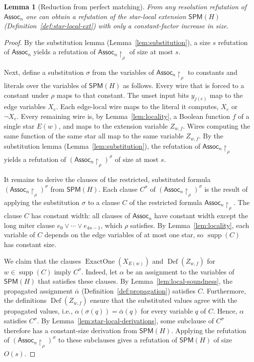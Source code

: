 \documentclass[11pt]{article}
\newtheorem{lemma}[theorem]{Lemma}
\theoremstyle{definition}
\theoremstyle{remark}
\newcommand{\Assoc}{\mathsf{Assoc}}
\newcommand{\SPM}{\mathsf{SPM}}
\newcommand{\supp}{\operatorname{supp}}
\begin{document}
\begin{lemma}[Reduction from perfect matching]
\label{lem:reduction}
From any resolution refutation of $\Assoc_n$ one can obtain a refutation of
the star-local extension $\SPM(H)$ (Definition~\ref{def:star-local-ext}) with only a constant-factor increase in size.
\end{lemma}

\begin{proof}
By the substitution lemma (Lemma~\ref{lem:substitution}), a size $s$ refutation of $\Assoc_n$ yields a refutation of
$\Assoc_n\!\upharpoonright_\rho$ of size at most $s$.

Next, define a substitution $\sigma$ from the variables of $\Assoc_n\!\upharpoonright_\rho$ to constants and literals over the variables of
$\SPM(H)$ as follows. Every wire that is forced to a constant under $\rho$ maps to that constant. The unset input bits
$y_{j(e)}$ map to the edge variables $X_e$. Each edge-local wire maps to the literal it computes, $X_e$ or $\neg X_e$. Every remaining wire is, by Lemma~\ref{lem:locality}, a Boolean function $f$ of a single
star $E(w)$, and maps to the extension variable $Z_{w,f}$. Wires computing the same function of the same star all map to the same variable $Z_{w,f}$. By the substitution lemma (Lemma~\ref{lem:substitution}), the refutation of $\Assoc_n\!\upharpoonright_\rho$ yields a refutation of
$(\Assoc_n\!\upharpoonright_\rho)^\sigma$ of size at most $s$.

It remains to derive the clauses of the restricted, substituted formula $(\Assoc_n\!\upharpoonright_\rho)^\sigma$ from $\SPM(H)$. Each clause $C^\sigma$ of $(\Assoc_n\!\upharpoonright_\rho)^\sigma$ is the result of applying the substitution $\sigma$ to a clause $C$ of the restricted formula $\Assoc_n\!\upharpoonright_\rho$. The clause $C$ has constant width: all clauses of $\Assoc_n$ have constant width except the long miter clause $e_0\vee\cdots\vee e_{4n-1}$, which $\rho$ satisfies. By Lemma~\ref{lem:locality}, each variable of $C$ depends on the edge variables of at most one star, so $\supp(C)$ has constant size. 

We claim that the clauses $\operatorname{ExactOne}(X_{E(w)})$ and $\operatorname{Def}(Z_{w,f})$ for $w\in \supp(C)$ imply $C^\sigma$. Indeed, let $\alpha$ be an assignment to the variables of $\SPM(H)$ that satisfies these clauses. By Lemma~\ref{lem:local-soundness}, the propagated assignment $\bar\alpha$ (Definition~\ref{def:propagation}) satisfies $C$. Furthermore, the definitions $\operatorname{Def}(Z_{w,f})$ ensure that the substituted values agree with the propagated values, i.e., $\alpha(\sigma(q))=\bar\alpha(q)$ for every variable $q$ of $C$. Hence, $\alpha$ satisfies $C^\sigma$. By Lemma~\ref{lem:star-local-derivations}, some subclause of $C^\sigma$ therefore has a constant-size derivation from $\SPM(H)$. Applying the refutation of $(\Assoc_n\!\upharpoonright_\rho)^\sigma$ to these subclauses gives a refutation of $\SPM(H)$ of size $O(s)$.
\end{proof}
\end{document}
